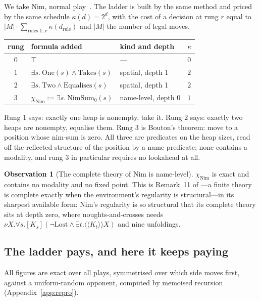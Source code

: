 \documentclass[11pt,a4paper]{article}
\theoremstyle{plain}
\theoremstyle{definition}
\newtheorem{observation}[theorem]{Observation}
\theoremstyle{remark}
\begin{document}
We take Nim, normal play~\cite{bouton}. The ladder is built by the same method and priced by the
same schedule $\kappa(d) = 2^d$, with the cost of a decision at rung $r$ equal to $|M| \cdot
\sum_{\text{rules } 1..r} \kappa(d_{\text{rule}})$ and $|M|$ the number of legal moves.

\begin{center}
\small
\begin{tabular}{@{}clll@{}}
\toprule
rung & formula added & kind and depth & $\kappa$ \\
\midrule
$0$ & $\top$ & --- & $0$ \\
$1$ & $\exists s.\ \mathrm{One}(s) \wedge \mathrm{Takes}(s)$ & spatial, depth 1 & $2$ \\
$2$ & $\exists s.\ \mathrm{Two} \wedge \mathrm{Equalises}(s)$ & spatial, depth 1 & $2$ \\
$3$ & $\chi_{\mathrm{Nim}} := \exists s.\ \mathrm{NimSum}_0(s)$ & name-level, depth 0 & $1$ \\
\bottomrule
\end{tabular}
\end{center}

Rung 1 says: exactly one heap is nonempty, take it. Rung 2 says: exactly two heaps are nonempty,
equalise them. Rung 3 is Bouton's theorem: move to a position whose nim-sum is zero. All three
are predicates on the heap sizes, read off the reflected structure of the position by a name
predicate; none contains a modality, and rung 3 in particular requires no lookahead at all.

\begin{observation}[The complete theory of Nim is name-level]
$\chi_{\mathrm{Nim}}$ is exact and contains no modality and no fixed point. This is Remark~11 of
\cite{scientist}---a finite theory is complete exactly when the environment's regularity is
structural---in its sharpest available form: Nim's regularity is so structural that its complete
theory sits at depth zero, where noughts-and-crosses needs $\nu X.\forall s.[K_s](\neg
\mathrm{Lost} \wedge \exists t. \langle\langle K_t\rangle\rangle X)$ and nine unfoldings.
\end{observation}

\subsection{The ladder pays, and here it keeps paying}

All figures are exact over all plays, symmetrised over which side moves first, against a
uniform-random opponent, computed by memoised recursion (Appendix~\ref{app:repro}).
\end{document}
